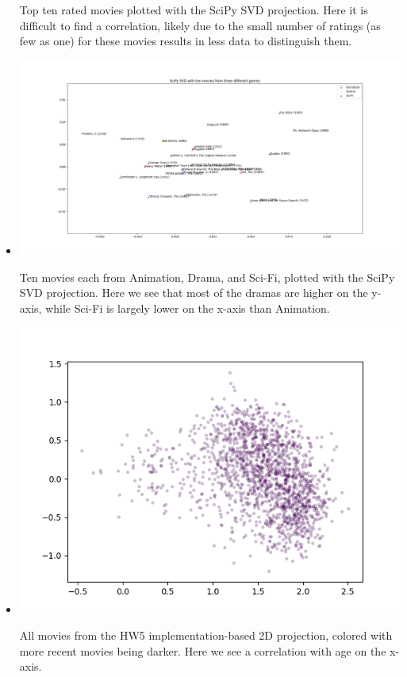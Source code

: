 \begin{itemize}
        Top ten rated movies plotted with the SciPy SVD projection. Here it is difficult to find a correlation, likely due to the small number of ratings (as few as one) for these movies results in less data to distinguish them.
    \item {}

        \includegraphics[width=\textwidth]{svd_three_genres.png}

        Ten movies each from Animation, Drama, and Sci-Fi, plotted with the SciPy SVD projection. Here we see that most of the dramas are higher on the y-axis, while Sci-Fi is largely lower on the x-axis  than Animation.
    \item {}

        \includegraphics[scale=.5]{age_coloring.png}

        All movies from the HW5 implementation-based 2D projection, colored with more recent movies being darker. Here we see a correlation with age on the x-axis.
\end{itemize}

